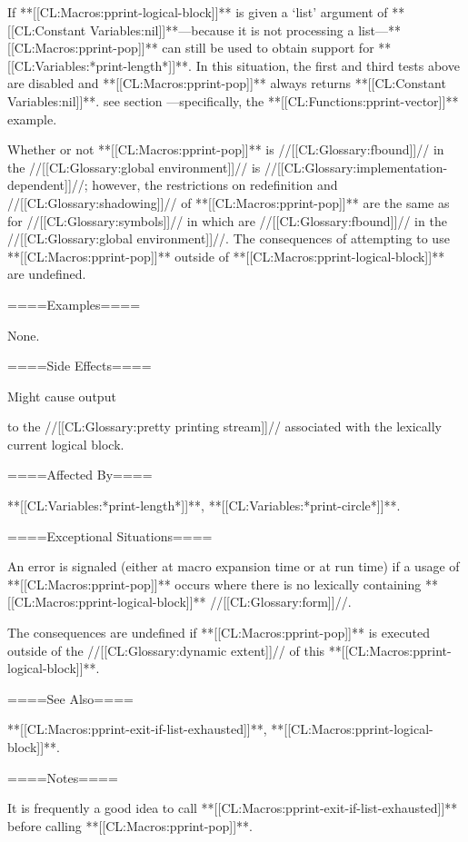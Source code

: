 If **[[CL:Macros:pprint-logical-block]]** is given a `list' argument of **[[CL:Constant Variables:nil]]**---because it is not processing a list---**[[CL:Macros:pprint-pop]]** can still be used to obtain support for **[[CL:Variables:*print-length*]]**. In this situation, the first and third tests above are disabled and **[[CL:Macros:pprint-pop]]** always returns **[[CL:Constant Variables:nil]]**. see section {\secref\PrettyPrinterExamples}---specifically, the **[[CL:Functions:pprint-vector]]** example.

Whether or not **[[CL:Macros:pprint-pop]]** is //[[CL:Glossary:fbound]]// in the //[[CL:Glossary:global environment]]// is //[[CL:Glossary:implementation-dependent]]//; however, the restrictions on redefinition and //[[CL:Glossary:shadowing]]// of **[[CL:Macros:pprint-pop]]** are the same as for //[[CL:Glossary:symbols]]// in  which are //[[CL:Glossary:fbound]]// in the //[[CL:Glossary:global environment]]//. The consequences of attempting to use **[[CL:Macros:pprint-pop]]** outside of **[[CL:Macros:pprint-logical-block]]** are undefined.

====Examples====

None.

====Side Effects====

Might cause output

to the //[[CL:Glossary:pretty printing stream]]// associated with the lexically current logical block.

====Affected By====

**[[CL:Variables:*print-length*]]**, **[[CL:Variables:*print-circle*]]**.

====Exceptional Situations====

An error is signaled (either at macro expansion time or at run time) if a usage of **[[CL:Macros:pprint-pop]]** occurs where there is no lexically containing **[[CL:Macros:pprint-logical-block]]** //[[CL:Glossary:form]]//.

The consequences are undefined if **[[CL:Macros:pprint-pop]]** is executed outside of the //[[CL:Glossary:dynamic extent]]// of this **[[CL:Macros:pprint-logical-block]]**.

====See Also====

**[[CL:Macros:pprint-exit-if-list-exhausted]]**, **[[CL:Macros:pprint-logical-block]]**.

====Notes====

It is frequently a good idea to call **[[CL:Macros:pprint-exit-if-list-exhausted]]** before calling **[[CL:Macros:pprint-pop]]**.

 
